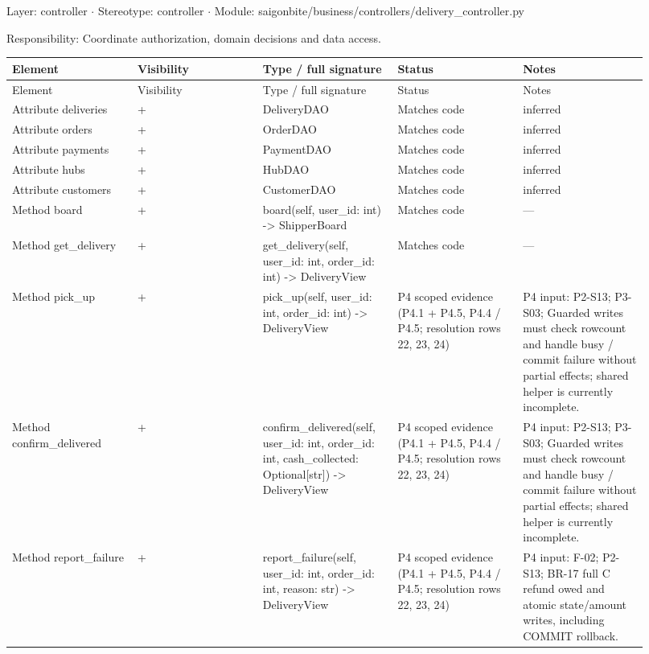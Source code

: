 Layer: controller \ensuremath{\cdot} Stereotype: \guillemotleft{}controller\guillemotright{} \ensuremath{\cdot} Module: saigonbite/business/controllers/delivery\_controller.py

Responsibility: Coordinate authorization, domain decisions and data access.

\begin{longtable}{>{\raggedright\arraybackslash}p{0.1840\linewidth}>{\raggedright\arraybackslash}p{0.1840\linewidth}>{\raggedright\arraybackslash}p{0.1840\linewidth}>{\raggedright\arraybackslash}p{0.1840\linewidth}>{\raggedright\arraybackslash}p{0.1840\linewidth}}
Element & Visibility & Type / full signature & Status & Notes \\
\hline\endfirsthead
Element & Visibility & Type / full signature & Status & Notes \\
\hline\endhead
Attribute deliveries & + & DeliveryDAO & Matches code & inferred \\
Attribute orders & + & OrderDAO & Matches code & inferred \\
Attribute payments & + & PaymentDAO & Matches code & inferred \\
Attribute hubs & + & HubDAO & Matches code & inferred \\
Attribute customers & + & CustomerDAO & Matches code & inferred \\
Method board & + & board(self, user\_id: int) -\textgreater{} ShipperBoard & Matches code & --- \\
Method get\_delivery & + & get\_delivery(self, user\_id: int, order\_id: int) -\textgreater{} DeliveryView & Matches code & --- \\
Method pick\_up & + & pick\_up(self, user\_id: int, order\_id: int) -\textgreater{} DeliveryView & P4 scoped evidence (P4.1 + P4.5, P4.4 / P4.5; resolution rows 22, 23, 24) & P4 input: P2-S13; P3-S03; Guarded writes must check rowcount and handle busy / commit failure without partial effects; shared helper is currently incomplete. \\
Method confirm\_delivered & + & confirm\_delivered(self, user\_id: int, order\_id: int, cash\_collected: Optional[str]) -\textgreater{} DeliveryView & P4 scoped evidence (P4.1 + P4.5, P4.4 / P4.5; resolution rows 22, 23, 24) & P4 input: P2-S13; P3-S03; Guarded writes must check rowcount and handle busy / commit failure without partial effects; shared helper is currently incomplete. \\
Method report\_failure & + & report\_failure(self, user\_id: int, order\_id: int, reason: str) -\textgreater{} DeliveryView & P4 scoped evidence (P4.1 + P4.5, P4.4 / P4.5; resolution rows 22, 23, 24) & P4 input: F-02; P2-S13; BR-17 full C refund owed and atomic state/amount writes, including COMMIT rollback. \\

\end{longtable}
